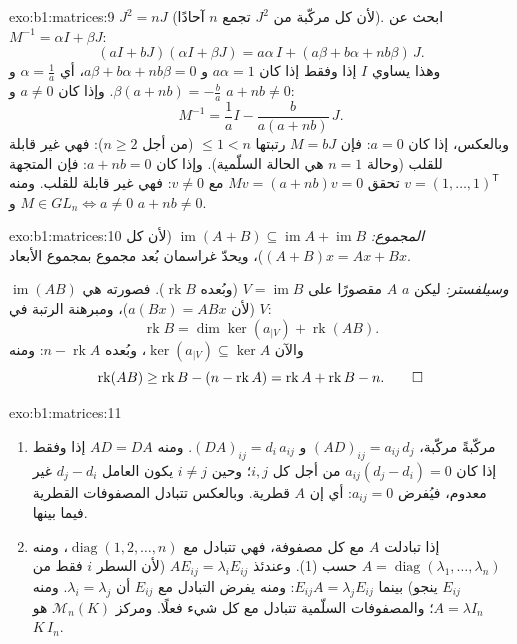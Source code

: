 \begin{solution}{exo:b1:matrices:9}
$J^2 = nJ$ (لأن كل مركّبة من $J^2$ تجمع $n$ آحادًا). ابحث عن $M^{-1} =
\alpha I + \beta J$:
\[
(aI + bJ)(\alpha I + \beta J)
= a\alpha\, I + (a\beta + b\alpha + nb\beta)\, J .
\]
وهذا يساوي $I$ إذا وفقط إذا كان $a\alpha = 1$ و $a\beta + b\alpha + nb\beta =
0$، أي $\alpha = \frac1a$ و $\beta(a + nb) = -\frac ba$. وإذا كان $a
\neq 0$ و $a + nb \neq 0$:
\[
M^{-1} = \frac 1a I - \frac{b}{a(a + nb)}\, J .
\]
وبالعكس، إذا كان $a = 0$: فإن $M = bJ$ رتبتها $\leq 1 < n$ (من أجل $n \geq
2$): فهي غير قابلة للقلب (وحالة $n = 1$ هي الحالة السلّمية). وإذا كان $a + nb = 0$:
فإن المتجهة $v = (1, \dots, 1)^{\mathsf T}$ تحقق $Mv = (a +
nb)v = 0$ مع $v \neq 0$: فهي غير قابلة للقلب. ومنه $M \in GL_n \iff a
\neq 0$ و $a + nb \neq 0$.
\end{solution}

\begin{solution}{exo:b1:matrices:10}
\emph{المجموع:} $\operatorname{im}(A + B) \subseteq \operatorname{im} A
+ \operatorname{im} B$ (لأن كل $(A+B)x = Ax + Bx$)، ويحدّ غراسمان
بُعد مجموع بمجموع الأبعاد.

\emph{وسيلفستر:} ليكن $a$  $A$ مقصورًا على $V =
\operatorname{im} B$ (وبُعده $\operatorname{rk} B$). فصورته هي
$\operatorname{im}(AB)$ (لأن $a(Bx) = ABx$)، ومبرهنة الرتبة في $V$:
\[
\operatorname{rk} B = \dim\ker(a_{|V}) + \operatorname{rk}(AB) .
\]
والآن $\ker(a_{|V}) \subseteq \ker A$، وبُعده $n -
\operatorname{rk} A$: ومنه
\[
\operatorname{rk}(AB) \geq \operatorname{rk} B - (n -
\operatorname{rk} A) = \operatorname{rk} A + \operatorname{rk} B -
n . \qedhere
\]
\end{solution}

\begin{solution}{exo:b1:matrices:11}
\begin{enumerate}
  \item مركّبةً مركّبة، $(AD)_{ij} = a_{ij}\,d_j$ و $(DA)_{ij} =
        d_i\,a_{ij}$. ومنه $AD = DA$ إذا وفقط إذا كان $a_{ij}(d_j - d_i) = 0$
        من أجل كل $i, j$؛ وحين $i \neq j$ يكون العامل $d_j - d_i$
        غير معدوم، فيُفرض $a_{ij} = 0$: أي إن $A$ قطرية.
        وبالعكس تتبادل المصفوفات القطرية فيما بينها.
  \item إذا تبادلت $A$ مع كل مصفوفة، فهي تتبادل مع
        $\operatorname{diag}(1, 2, \dots, n)$، ومنه $A =
        \operatorname{diag}(\lambda_1, \dots, \lambda_n)$ حسب (1).
        وعندئذ $A E_{ij} = \lambda_i E_{ij}$ (لأن السطر $i$ فقط من
        $E_{ij}$ ينجو) بينما $E_{ij} A = \lambda_j E_{ij}$:
        ومنه يفرض التبادل مع $E_{ij}$ أن $\lambda_i = \lambda_j$.
        ومنه $A = \lambda I_n$؛ والمصفوفات السلّمية تتبادل
        مع كل شيء فعلًا. ومركز $\mathcal{M}_n(K)$ هو
        $K\,I_n$.
\end{enumerate}
\end{solution}

